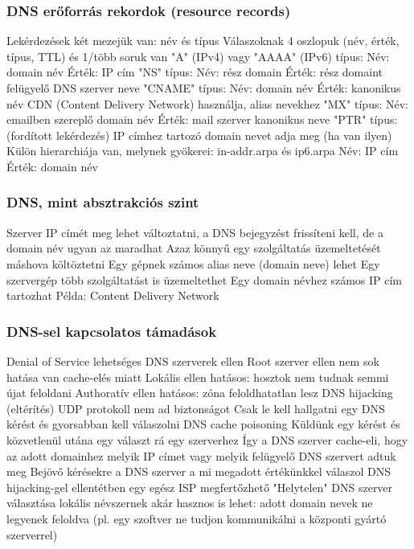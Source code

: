 \documentclass[12pt,a4paper]{article}
\begin{document}
\pagebreak

\subsubsection{DNS erőforrás rekordok (resource records)}

\begin{outline}
	\1 Lekérdezések két mezejük van: név és típus
	\1 Válaszoknak 4 oszlopuk (név, érték, típus, TTL) és 1/több soruk van
	\1 "A" (IPv4) vagy "AAAA" (IPv6) típus:
		\2 Név: domain név
		\2 Érték: IP cím
	\1 "NS" típus:
		\2 Név: rész domain
		\2 Érték: rész domaint felügyelő DNS szerver neve
	\1 "CNAME" típus:
		\2 Név: domain név
		\2 Érték: kanonikus név
		\2 CDN (Content Delivery Network) használja, alias nevekhez
	\1 "MX" típus:
		\2 Név: emailben szereplő domain név
		\2 Érték: mail szerver kanonikus neve
	\1 "PTR" típus: (fordított lekérdezés)
		\2 IP címhez tartozó domain nevet adja meg (ha van ilyen)
		\2 Külön hierarchiája van, melynek gyökerei: in-addr.arpa és ip6.arpa
		\2 Név: IP cím
		\2 Érték: domain név
\end{outline}

\pagebreak

\subsubsection{DNS, mint absztrakciós szint}

\begin{outline}
	\1 Szerver IP címét meg lehet változtatni, a DNS bejegyzést frissíteni kell, de a domain név ugyan az maradhat
		\2 Azaz könnyű egy szolgáltatás üzemeltetését máshova költöztetni
	\1 Egy gépnek számos alias neve (domain neve) lehet
		\2 Egy szervergép több szolgáltatást is üzemeltethet
	\1 Egy domain névhez számos IP cím tartozhat
		\2 Példa: Content Delivery Network
\end{outline}

\subsubsection{DNS-sel kapcsolatos támadások}

\begin{outline}
	\1 Denial of Service lehetséges DNS szerverek ellen
		\2 Root szerver ellen nem sok hatása van cache-elés miatt
		\2 Lokális ellen hatásos: hosztok nem tudnak semmi újat feloldani
		\2 Authoratív ellen hatásos: zóna feloldhatatlan lesz
	\1 DNS hijacking (eltérítés)
		\2 UDP protokoll nem ad biztonságot
		\2 Csak le kell hallgatni egy DNS kérést és gyorsabban kell válaszolni
	\1 DNS cache poisoning
		\2 Küldünk egy kérést és közvetlenül utána egy választ rá egy szerverhez
		\2 Így a DNS szerver cache-eli, hogy az adott domainhez melyik IP címet vagy melyik felügyelő DNS szervert adtuk meg
		\2 Bejövő kérésekre a DNS szerver a mi megadott értékünkkel válaszol
		\2 DNS hijacking-gel ellentétben egy egész ISP megfertőzhető
	\1 "Helytelen" DNS szerver választása lokális névszernek akár hasznos is lehet: adott domain nevek ne legyenek feloldva (pl. egy szoftver ne tudjon kommunikálni a központi gyártó szerverrel)
\end{outline}
\end{document}
